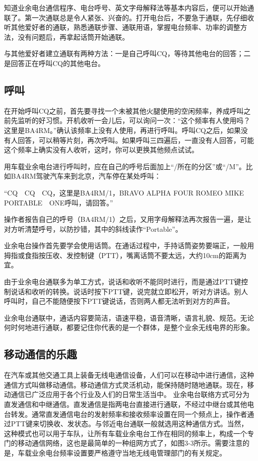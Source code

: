 \documentclass[12pt,UTF8]{ctexbook}
\begin{document}
知道业余电台通信程序、电台呼号、英文字母解释法等基本内容后，便可以开始通联了。第一次通联总是令人紧张、兴奋的。打开电台后，不要急于通联，先仔细收听其他爱好者的通联，熟悉通联步骤、通联用语，掌握电台频率、功率的调整方法，没有问题后，再拿起话筒开始通联。

与其他爱好者建立通联有两种方法：一是自己呼叫CQ，等待其他电台的回答；二是回答正在呼叫CQ的其他电台。

\subsection{呼叫}

在开始呼叫CQ之前，首先要寻找一个未被其他火腿使用的空闲频率，养成呼叫之前先监听的好习惯。开机收听一会儿后，可以询问一次：“这个频率有人使用吗？这里是BA4RM。”确认该频率上没有人使用，再进行呼叫。呼叫CQ之后，如果没有人回答，可以稍等片刻，再次呼叫。如果呼叫三四遍后，一直没有人回答，可能这个频率上确实没有人收听，这时，你可以更换其他频点试试。

用车载业余电台进行呼叫时，应在自己的呼号后面加上“/所在的分区”或“/M”。比如BA4RM驾驶汽车来到北京，汽车停在某处呼叫：

“CQ　CQ　CQ，这里是BA4RM/1，BRAVO ALPHA FOUR ROMEO MIKE PORTABLE　ONE呼叫，请回答。”

操作者报告自己的呼号（BA4RM/1）之后，又用字母解释法再次报告一遍，是让对方听清楚呼号，以防抄错，其中的斜线读作“Portable”。

业余电台操作首先要学会使用话筒。在通话过程中，手持话筒姿势要端正，一般用拇指或食指按压收、发控制键（PTT），嘴离话筒不要太远，大约10cm的距离为宜。

由于业余电台通联多为单工方式，说话和收听不能同时进行，而是通过PTT键控制说话和收听的转换。说话时按下PTT键，说完就立即松开，听对方讲话。别人呼叫时，自己不能随便按下PTT键说话，否则两人都无法听到对方的声音。

业余电台通联中，通话内容要简洁，语速平稳，语音清晰，语言礼貌、规范。无论何时何地进行通联，都要记住你代表的是一个群体，是整个业余无线电界的形象。

\subsection{移动通信的乐趣}

在汽车或其他交通工具上装备无线电通信设备，人们可以在移动中进行通信，这种通信方式叫做移动通信。移动通信方式灵活机动，能保持随时随地通联。现在，移动通信已广泛应用于各个行业及人们的日常生活当中。
业余电台联络方式可分为直发通信和中继通信。直发通信是指两电台直接进行通联，不经过中继台或其他电台转发。通常直发通信电台的发射频率和接收频率设置在同一个频点上，操作者通过PTT键来切换收、发状态。与邻近电台通联一般就选用这种通信方式。当然，这种模式也可以用于车队，让所有车载业余电台工作在相同的频率上，构成一个专门的移动通信网络，这也是最简单的一种组网方式了，如图3-3所示。需要注意的是，车载业余电台频率设置要严格遵守当地无线电管理部门的有关规定。
\end{document}
